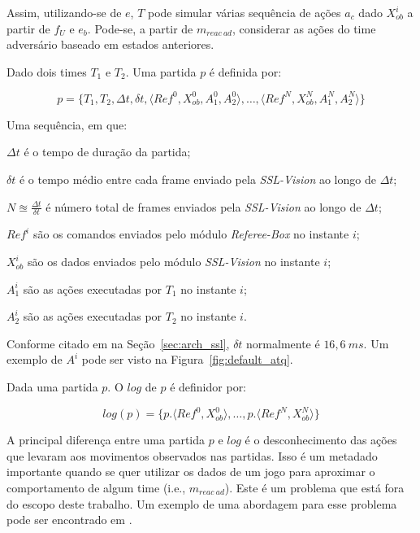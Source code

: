 Assim, utilizando-se de $e$, $T$ pode simular várias sequência de ações $a_c$
dado $X_{ob}^{i}$ a partir de $f_{U}$ e $e_b$. Pode-se, a partir de $m_{reac{\
}ad}$, considerar as ações do time adversário baseado em estados anteriores.

\begin{defi}[Partida]
  Dado dois times $T_1$ e $T_2$. Uma partida $p$ é definida por:

  \[
    p = \lbrace T_1, T_2, \Delta t, \delta t, \langle Ref^{0}, X_{ob}^{0}, A_1^{0}, A_2^{0}\rangle, 
    \dots, \langle Ref^{N}, X_{ob}^{N}, A_1^{N}, A_2^{N} \rangle \rbrace
  \]

  Uma sequência, em que:
  \begin{description}
    \item $\Delta t$ é o tempo de duração da partida;
    \item $\delta t$ é o tempo médio entre cada frame enviado pela \textit{SSL-Vision} ao longo de $\Delta t$;
    \item $N \approxeq \frac{\Delta t}{\delta t}$ é número total de frames enviados pela \textit{SSL-Vision}
      ao longo de $\Delta t$;
    \item $Ref^{i}$ são os comandos enviados pelo módulo \textit{Referee-Box} no instante $i$;
    \item $X_{ob}^{i}$ são os dados enviados pelo módulo \textit{SSL-Vision} no instante $i$;
    \item $A_1^{i}$ são as ações executadas por $T_1$ no instante $i$;
    \item $A_2^{i}$ são as ações executadas por $T_2$ no instante $i$.
  \end{description}
\end{defi}

Conforme citado em na Seção~\ref{sec:arch_ssl}, $\delta t$ normalmente é $16,6{\ }ms$.
Um exemplo de $A^{i}$ pode ser visto na Figura~\ref{fig:default_atq}.

\begin{defi}[Logs]
  Dada uma partida $p$. O $log$ de $p$ é definidor por:

  \[
    log(p) = \lbrace p.\langle Ref^{0}, X_{ob}^{0}\rangle, \dots, p.\langle Ref^{N}, X_{ob}^{N}\rangle \rbrace
  \]
\end{defi}

A principal diferença entre uma partida $p$ e $log$ é o desconhecimento das
ações que levaram aos movimentos observados nas partidas. Isso é um metadado
importante quando se quer utilizar os dados de um jogo para aproximar o
comportamento de algum time (i.e., $m_{reac{\ }ad}$).  Este é um problema que
está fora do escopo deste trabalho. Um exemplo de uma abordagem para esse
problema pode ser encontrado em \cite{vail2008crf}.

